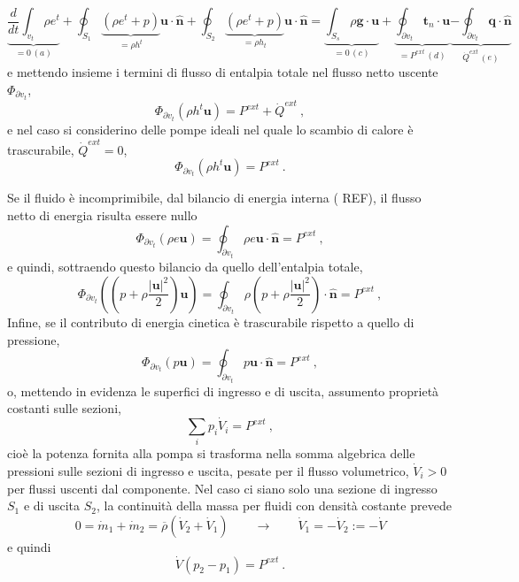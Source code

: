 \begin{equation}
    \underbrace{\dfrac{d}{dt} \int_{v_t} \rho e^t}_{=0 \, (a)} + \oint_{S_1} \underbrace{\left( \rho e^t + p \right)}_{=\rho h^t} \mathbf{u} \cdot \mathbf{\hat{n}} + \oint_{S_2}  \underbrace{\left( \rho e^t + p \right)}_{=\rho h_t} \mathbf{u} \cdot \mathbf{\hat{n}} =  \underbrace{\int_{S_s}\rho \mathbf{g} \cdot \mathbf{u}}_{=0 \, (c)} + \underbrace{\oint_{\partial v_t} \mathbf{t}_n \cdot \mathbf{u}}_{=P^{ext} \, (d)} \underbrace{- \oint_{\partial v_t} \mathbf{q} \cdot \mathbf{\hat{n}}}_{\dot{Q}^{ext} \, (e)}
\end{equation}
e mettendo insieme i termini di flusso di entalpia totale nel flusso netto uscente $\Phi_{\partial v_t}$,
\begin{equation}
    \Phi_{\partial v_t}(\rho h^t \mathbf{u}) = P^{ext} + \dot{Q}^{ext} \ ,
\end{equation}
e nel caso si considerino delle pompe ideali nel quale lo scambio di calore è trascurabile, $\dot{Q}^{ext} = 0$,
\begin{equation}
    \Phi_{\partial v_t}(\rho h^t \mathbf{u}) = P^{ext} \ .
\end{equation}

Se il fluido è incomprimibile, dal bilancio di energia interna ({\color{red} REF}), il flusso netto di energia risulta essere nullo
\begin{equation}
    \Phi_{\partial v_t}(\rho e \mathbf{u}) = \oint_{\partial v_t} \rho e \mathbf{u} \cdot \mathbf{\hat{n}} = P^{ext} \ ,
\end{equation}
e quindi, sottraendo questo bilancio da quello dell'entalpia totale,
\begin{equation}
    \Phi_{\partial v_t}\left( \left( p + \rho \frac{|\mathbf{u}|^2}{2} \right) \mathbf{u} \right) = \oint_{\partial v_t} \rho \left( p + \rho \frac{|\mathbf{u}|^2}{2}\right) \cdot \mathbf{\hat{n}} = P^{ext} \ ,
\end{equation}
Infine, se il contributo di energia cinetica è trascurabile rispetto a quello di pressione,
\begin{equation}
    \Phi_{\partial v_t}\left( p \mathbf{u} \right) = \oint_{\partial v_t} p \mathbf{u} \cdot \mathbf{\hat{n}} = P^{ext} \ ,
\end{equation}
o, mettendo in evidenza le superfici di ingresso e di uscita, assumento proprietà costanti sulle sezioni,
\begin{equation}
    \sum_i p_i \dot{V}_i = P^{ext} \ ,
\end{equation}
cioè la potenza fornita alla pompa si trasforma nella somma algebrica delle pressioni sulle sezioni di ingresso e uscita, pesate per il flusso volumetrico, $\dot{V}_i > 0$ per flussi uscenti dal componente. Nel caso ci siano solo una sezione di ingresso $S_1$ e di uscita $S_2$, la continuità della massa per fluidi con densità costante prevede
\begin{equation}
    0 = \dot{m}_1 + \dot{m}_2 = \overline{\rho} (\dot{V}_2 + \dot{V}_1) \qquad \rightarrow \qquad \dot{V}_1 = - \dot{V}_2 := - \dot{V}
\end{equation}
e quindi
\begin{equation}
    \dot{V} \left( p_2 - p_1 \right) = P^{ext} \ .
\end{equation}

